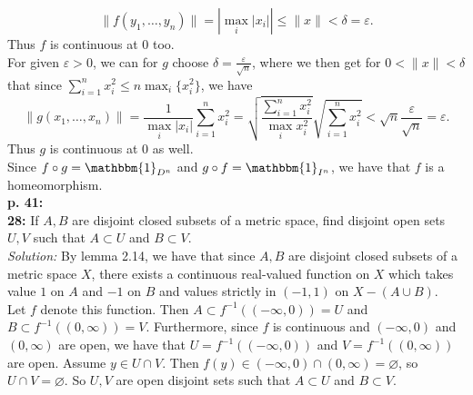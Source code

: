 \documentclass[a4paper]{article}
\begin{document}
    \[
        \|f(y_1, \ldots, y_n)\| = \left| \max_i |x_i|  \right| 
        \le \|x\| < \delta = \varepsilon.   
    \] 
    Thus $f$ is continuous at $0$ too.\\
    For given $\varepsilon > 0$, we can for $g$ choose
    $\delta = \frac{\varepsilon}{\sqrt{n} }$, where we then get for
    $0 < \|x\| < \delta$ that since
    $\sum_{i=1}^{n} x_i^2 \le n \max_i \{x_i^2\}$, we have
    \[
    \|g\left( x_1, \ldots, x_n \right) \|
    = \frac{1}{\max_i |x_i|  }
     \sum_{i=1}^{n} x_i^2
     = \sqrt{\frac{\sum_{i=1}^{n} x_i^2}{\max_i x_i^2}} 
     \sqrt{\sum_{i=1}^{n} x_i^2} 
     < \sqrt{n} \frac{\varepsilon}{\sqrt{n} } = \varepsilon.
    \] 
    Thus $g$ is continuous at $0$ as well.\\
    Since $f\circ g = \mathbbm{1}_{D^{n}}$ and
    $g\circ f = \mathbbm{1}_{I^{n}}$, we have that
    $f$ is a homeomorphism.\\
    \linebreak
    \textbf{p. 41:}\\
    \textbf{28:} If $A,B$ are disjoint closed subsets of a metric space, find
    disjoint open sets $U,V$ such that $A \subset U$ and $B \subset V$.\\
    \linebreak
    \textit{Solution:} By lemma 2.14, we have that since $A,B$ are disjoint
    closed subsets of a metric space $X$, there exists a 
    continuous real-valued function on $X$ which takes value $1$ on $A$ and
    $-1$ on $B$ and values strictly in $(-1,1)$ on $X - \left( A\cup B \right)
    $.\\
    Let $f$ denote this function. Then
    $A \subset f^{-1}\left( (-\infty, 0) \right) = U $ and
    $B \subset f^{-1}\left( (0, \infty) \right) = V $. Furthermore, since
    $f$ is continuous and $(-\infty, 0)$ and $(0, \infty)$ are
    open, we have that
    $U = f^{-1}\left( (- \infty, 0) \right) $ and
    $V= f^{-1}\left( (0, \infty) \right) $ are open. Assume
    $y \in U \cap V $. Then
    $f(y) \in \left( -\infty, 0 \right) \cap (0, \infty) = \varnothing$, so
    $U \cap V = \varnothing$. So $U,V$ are open disjoint sets such that
    $A \subset U$ and $B \subset V$.

    

    
    
    













    
    
    
\end{document}
